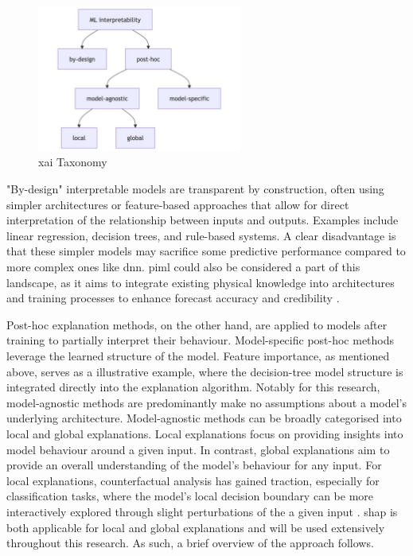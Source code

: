 \begin{figure}[ht]
    \centering
    \includegraphics[width=0.6\textwidth]{../figures/static/xai-taxonomy.jpg}
    \caption{\acrshort{xai} Taxonomy \citep{Molnar2025}}
    \label{fig:xai-taxonomy}
\end{figure}

"By-design" interpretable models are transparent by construction, often using simpler architectures or feature-based approaches that allow for direct interpretation of the relationship between inputs and outputs. Examples include linear regression, decision trees, and rule-based systems. A clear disadvantage is that these simpler models may sacrifice some predictive performance compared to more complex ones like \acrfull{dnn}. \acrfull{piml} could also be considered a part of this landscape, as it aims to integrate existing physical knowledge into architectures and training processes to enhance forecast accuracy and credibility \citep{Luo2025,Pathak2022}. 

Post-hoc explanation methods, on the other hand, are applied to models after training to partially interpret their behaviour. Model-specific post-hoc methods leverage the learned structure of the model. Feature importance, as mentioned above, serves as a illustrative example, where the decision-tree model structure is integrated directly into the explanation algorithm. Notably for this research, model-agnostic methods are predominantly make no assumptions about a model's underlying architecture. Model-agnostic methods can be broadly categorised into local and global explanations. Local explanations focus on providing insights into model behaviour around a given input. In contrast, global explanations aim to provide an overall understanding of the model's behaviour for any input. For local explanations, counterfactual analysis has gained traction, especially for classification tasks, where the model's local decision boundary can be more interactively explored through slight perturbations of the a given input \citep{Mothilal2019}. \acrfull{shap} is both applicable for local and global explanations and will be used extensively throughout this research. As such, a brief overview of the approach follows.

